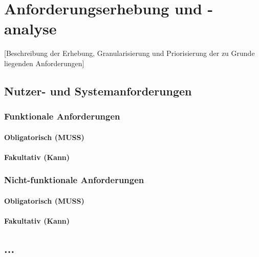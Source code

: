 \chapter{Anforderungserhebung und -analyse}
[Beschreibung der Erhebung, Granularisierung und Priorisierung der zu Grunde liegenden Anforderungen]
\section{Nutzer- und Systemanforderungen}
\subsection{Funktionale Anforderungen}
\subsubsection{Obligatorisch (MUSS)}
\subsubsection{Fakultativ (Kann)}
\subsection{Nicht-funktionale Anforderungen}

\subsubsection{Obligatorisch (MUSS)}
\subsubsection{Fakultativ (Kann)}
\section{...}


